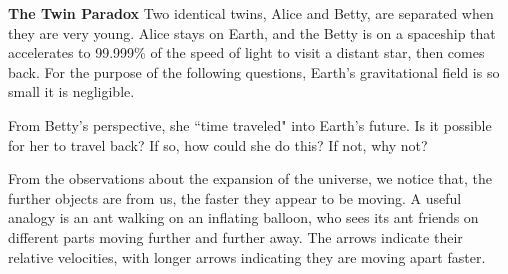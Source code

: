 \documentclass[12pt]{exam}
\begin{document}
\begin{questions}
	
\clearpage
	\question \textbf{The Twin Paradox} Two identical twins, Alice and Betty, are separated when they are very young. Alice stays on Earth, and the Betty is on a spaceship that accelerates to 99.999\% of the speed of light to visit a distant star, then comes back. For the purpose of the following questions, Earth's gravitational field is so small it is negligible.
		
	\question From Betty's perspective, she ``time traveled" into Earth's future. Is it possible for her to travel back? If so, how could she do this? If not, why not?
		\vspace{1in}

\clearpage
	\question From the observations about the expansion of the universe, we notice that, the further objects are from us, the faster they appear to be moving. A useful analogy is an ant walking on an inflating balloon, who sees its ant friends on different parts moving further and further away. The arrows indicate their relative velocities, with longer arrows indicating they are moving apart faster.
	\begin{center}
	
	\end{center}
	\begin{parts}

\end{parts}
\end{questions}
\end{document}
